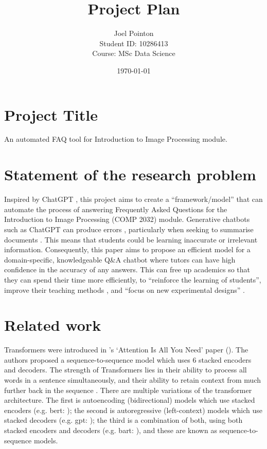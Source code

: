 \documentclass{article}
\title{\vspace{-0.5cm}Project Plan }
\author{Joel Pointon\\Student ID: 10286413\\Course: MSc Data Science}
\date{\today}
\begin{document}
\maketitle
\section{Project Title}
An automated FAQ tool for Introduction to Image Processing module.

\section{Statement of the research problem} 
Inspired by ChatGPT \citep{ChatGPTrelease}, this project aims to create a ``framework/model'' that can automate the process of answering Frequently Asked Questions for the Introduction to Image Processing (COMP 2032) module. Generative chatbots such as ChatGPT can produce errors \citep{marcus2018, Bender21, Eva}, particularly when seeking to summarise documents \citep{Durmus_2020}. This means that students could be learning inaccurate or irrelevant information. Consequently, this paper aims to propose an efficient model for a domain-specific, knowledgeable Q\&A chatbot where tutors can have high confidence in the accuracy of any answers. This can free up academics so that they can spend their time more efficiently, to ``reinforce the learning of students'', improve their teaching methods \citep{Prez2020}, and ``focus on new experimental designs'' \citep{Eva}.

\section{Related work}
Transformers were introduced in \citeauthor{vaswani2017attention}'s `Attention Is All You Need' paper (\citeyear{vaswani2017attention}). The authors proposed a sequence-to-sequence model which uses 6 stacked encoders and decoders. The strength of Transformers lies in their ability to process all words in a sentence simultaneously, and their ability to retain context from much further back in the sequence \citep{vaswani2017attention}. There are multiple variations of the transformer architecture. The first is autoencoding (bidirectional) models which use stacked encoders (e.g. \acrshort{bert}: \citet{devlin2019bert}); the second is autoregressive (left-context) models which use stacked decoders (e.g. \acrshort{gpt}: \citet{radford2018improving}); the third is a combination of both, using both stacked encoders and decoders (e.g. \acrshort{bart}: \citet{lewis2019bart}), and these are known as sequence-to-sequence models.
\end{document}
